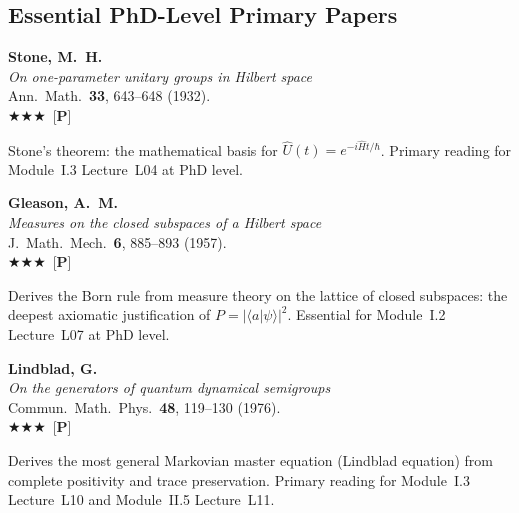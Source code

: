 \documentclass[11pt,a4paper]{article}
\newcommand{\essential}{$\bigstar\bigstar\bigstar$}
\newenvironment{bibentry}[1]{\begin{tcolorbox}[entrybox=#1,top=4pt,bottom=4pt]}{\end{tcolorbox}\smallskip}
\begin{document}
\subsection{Essential PhD-Level Primary Papers}

\begin{bibentry}{t5light}
\textbf{Stone, M.~H.}\\
\textit{On one-parameter unitary groups in Hilbert space}\\
Ann.~Math.~\textbf{33}, 643--648 (1932).\\[3pt]
\essential\ [\textbf{P}]\\[3pt]
\begin{tcolorbox}[annotbox]
Stone's theorem: the mathematical basis for $\hat{U}(t)=e^{-i\hat{H}t/\hbar}$.
Primary reading for Module~I.3 Lecture~L04 at PhD level.
\end{tcolorbox}
\end{bibentry}

\begin{bibentry}{t5light}
\textbf{Gleason, A.~M.}\\
\textit{Measures on the closed subspaces of a Hilbert space}\\
J.~Math.~Mech.~\textbf{6}, 885--893 (1957).\\[3pt]
\essential\ [\textbf{P}]\\[3pt]
\begin{tcolorbox}[annotbox]
Derives the Born rule from measure theory on the lattice of closed subspaces:
the deepest axiomatic justification of $P=|\langle a|\psi\rangle|^2$.
Essential for Module~I.2 Lecture~L07 at PhD level.
\end{tcolorbox}
\end{bibentry}

\begin{bibentry}{t5light}
\textbf{Lindblad, G.}\\
\textit{On the generators of quantum dynamical semigroups}\\
Commun.~Math.~Phys.~\textbf{48}, 119--130 (1976).\\[3pt]
\essential\ [\textbf{P}]\\[3pt]
\begin{tcolorbox}[annotbox]
Derives the most general Markovian master equation (Lindblad equation) from
complete positivity and trace preservation. Primary reading for Module~I.3
Lecture~L10 and Module~II.5 Lecture~L11.
\end{tcolorbox}
\end{bibentry}
\end{document}
